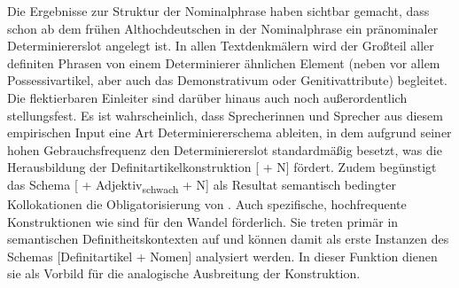 Die Ergebnisse zur Struktur der Nominalphrase haben sichtbar gemacht, dass schon ab dem frühen Althochdeutschen in der Nominalphrase ein pränominaler Determiniererslot angelegt ist. In allen Textdenkmälern wird der Großteil aller definiten Phrasen von einem Determinierer ähnlichen Element (neben  vor allem Possessivartikel, aber auch das Demonstrativum  oder Genitivattribute) begleitet. Die flektierbaren Einleiter sind darüber hinaus auch noch außerordentlich stellungsfest. Es ist wahrscheinlich, dass Sprecherinnen und Sprecher aus diesem empirischen Input eine Art Determiniererschema ableiten, in dem  aufgrund seiner hohen Gebrauchsfrequenz den Determiniererslot standardmäßig besetzt, was die Herausbildung der Definitartikelkonstruktion [ + N] fördert. Zudem begünstigt das Schema [ + Adjektiv\textsubscript{schwach} + N] als Resultat semantisch bedingter Kollokationen die Obligatorisierung von . Auch spezifische, hochfrequente Konstruktionen wie  sind für den Wandel förderlich. Sie treten primär in semantischen Definitheitskontexten auf und können damit als erste Instanzen des Schemas [Definitartikel + Nomen] analysiert werden. In dieser Funktion dienen sie als Vorbild für die analogische Ausbreitung der Konstruktion. 






